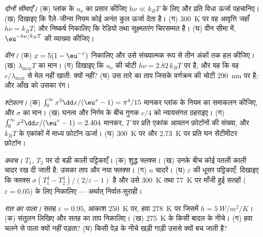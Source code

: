 \begin{exercise}[$\star\star$]\label{exo:b2:thermal-radiation:5}
\emph{दोनों सीमाएँ।} (क) प्लांक के $u_\nu$ का प्रसार कीजिए $h\nu \ll k_BT$ के लिए और
प्रति विधा ऊर्जा पहचानिए। (ख) दिखाइए कि रैले--जीन्स नियम
कोई अनंत कुल ऊर्जा देता है। (ग) \qty{300}{K} पर वह आवृत्ति जहाँ
$h\nu = k_BT$; और निष्कर्ष निकालिए कि रेडियो तथा सूक्ष्मतरंग 
चिरसम्मत है। (घ) वीन सीमा में, $\eu^{-h\nu/k_BT}$ की व्याख्या कीजिए।
\end{exercise}

\begin{exercise}[$\star\star$]\label{exo:b2:thermal-radiation:6}
\emph{वीन।} (क) $x = 5(1 - \eu^{-x})$ निकालिए और उसे संख्यात्मक रूप से
तीन अंकों तक हल कीजिए। (ख) $\lambda_{\max}T$ का मान। (ग) दिखाइए कि $u_\nu$
की चोटी $h\nu = 2.82\,k_BT$ पर है, और यह कि वह
$c/\lambda_{\max}$ से मेल नहीं खाती: क्यों नहीं? (घ) उस तारे का ताप जिसके वर्णक्रम की
चोटी \qty{290}{nm} पर है; और आँख को उसका रंग।
\end{exercise}

\begin{exercise}[$\star\star$]\label{exo:b2:thermal-radiation:7}
\emph{श्टेफ़ान।} (क) $\int_0^\infty x^3\dd x/(\eu^x - 1) = \pi^4/15$ मानकर
प्लांक के नियम का समाकलन कीजिए, और $\sigma$ का मान।
(ख) घनत्व और निर्गम के बीच गुणक $c/4$ को न्यायसंगत ठहराइए। (ग)
$\int_0^\infty x^2\dd x/(\eu^x - 1) = 2.404$ मानकर, $T$ पर प्रति एकांक आयतन
फ़ोटॉनों की संख्या, और $k_BT$ के एकांकों में माध्य फ़ोटॉन ऊर्जा।
(घ) \qty{300}{K} पर और \qty{2.73}{K} पर प्रति घन सेंटीमीटर फ़ोटॉन।
\end{exercise}

\begin{exercise}[$\star\star$]\label{exo:b2:thermal-radiation:8}
\emph{कवच।} $T_1$, $T_2$ पर दो बड़ी काली पट्टिकाएँ। (क) शुद्ध फ्लक्स।
(ख) उनके बीच कोई पतली काली चादर रख दी जाती है: उसका ताप और
नया फ्लक्स। (ग) $n$ चादरें। (घ)  $\varepsilon$ की धूसर पट्टिकाएँ:
दिखाइए कि फ्लक्स $\sigma(T_1^4 - T_2^4)/(2/\varepsilon - 1)$ है और उसे
\qty{300}{K} तथा \qty{77}{K} पर माँजी हुई सतहों ($\varepsilon = 0.05$) के लिए
निकालिए --- अर्थात् निर्वात-सुराही।
\end{exercise}

\begin{exercise}[$\star\star$]\label{exo:b2:thermal-radiation:9}
\emph{रात का पाला।} सतह $\varepsilon = 0.95$, आकाश \qty{250}{K} पर, हवा
\qty{278}{K} पर जिसमें $h = \qty{5}{W/m^2/K}$। (क) संतुलन लिखिए और
सतह का ताप निकालिए। (ख) \qty{275}{K} के किसी बादल के नीचे। (ग) हवा चलने से
पाला क्यों नहीं पड़ता? (घ) किसी पेड़ के नीचे खड़ी गाड़ी उससे क्यों
बच जाती है?
\end{exercise}

